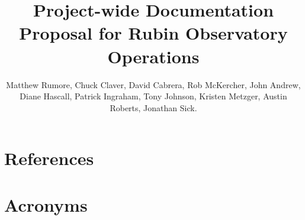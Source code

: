 \documentclass[SE,authoryear,toc]{lsstdoc}
\title{Project-wide Documentation Proposal for Rubin Observatory Operations}
\author{%
Matthew Rumore,
Chuck Claver,
David Cabrera,
Rob McKercher,
John Andrew,
Diane Hascall,
Patrick Ingraham,
Tony Johnson,
Kristen Metzger,
Austin Roberts,
Jonathan Sick.
}
\date{\vcsDate}
\begin{document}
\maketitle










\newpage
\section{References} \label{sec:bib}
\renewcommand{\refname}{} %


\section{Acronyms} \label{sec:acronyms}

\end{document}

